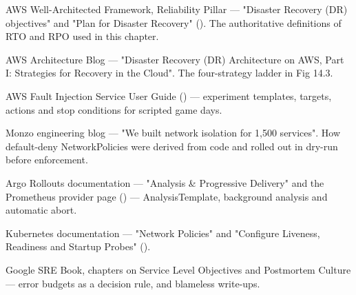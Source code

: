 \begin{iqbox}
\end{iqbox}

\begin{wbitem}
  \item AWS Well-Architected Framework, Reliability Pillar --- "Disaster Recovery (DR) objectives" and "Plan for Disaster Recovery" (). The authoritative definitions of RTO and RPO used in this chapter.
  \item AWS Architecture Blog --- "Disaster Recovery (DR) Architecture on AWS, Part I: Strategies for Recovery in the Cloud". The four-strategy ladder in Fig 14.3.
  \item AWS Fault Injection Service User Guide () --- experiment templates, targets, actions and stop conditions for scripted game days.
  \item Monzo engineering blog --- "We built network isolation for 1,500 services". How default-deny NetworkPolicies were derived from code and rolled out in dry-run before enforcement.
  \item Argo Rollouts documentation --- "Analysis \& Progressive Delivery" and the Prometheus provider page () --- AnalysisTemplate, background analysis and automatic abort.
  \item Kubernetes documentation --- "Network Policies" and "Configure Liveness, Readiness and Startup Probes" ().
  \item Google SRE Book, chapters on Service Level Objectives and Postmortem Culture --- error budgets as a decision rule, and blameless write-ups.
\end{wbitem}

